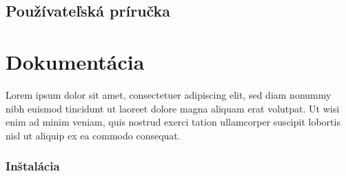 \newpage
{}
{
	\section{Používateľská príručka}
}
{
	\chapter{Dokumentácia}
}
Lorem ipsum dolor sit amet, consectetuer adipiscing elit, sed diam nonummy nibh euismod tincidunt ut laoreet dolore magna aliquam erat volutpat. Ut wisi enim ad minim veniam, quis nostrud exerci tation ullamcorper suscipit lobortis nisl ut aliquip ex ea commodo consequat. 
{
	\subsection{Inštalácia}
}
